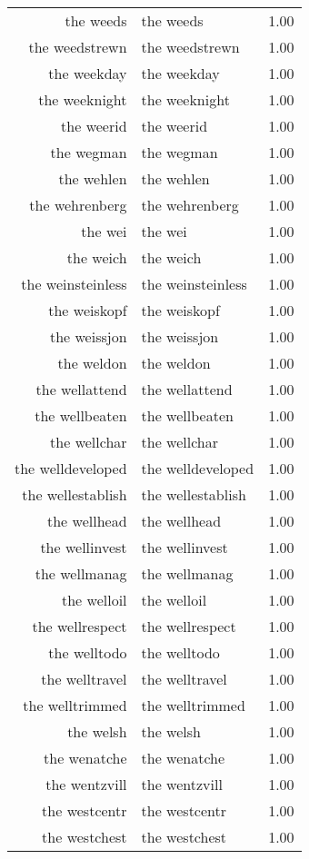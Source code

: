 \begin{table}[ht]
\begin{tabular}{rlr}
  the weeds & the weeds & 1.00 \\ 
  the weedstrewn & the weedstrewn & 1.00 \\ 
  the weekday & the weekday & 1.00 \\ 
  the weeknight & the weeknight & 1.00 \\ 
  the weerid & the weerid & 1.00 \\ 
  the wegman & the wegman & 1.00 \\ 
  the wehlen & the wehlen & 1.00 \\ 
  the wehrenberg & the wehrenberg & 1.00 \\ 
  the wei & the wei & 1.00 \\ 
  the weich & the weich & 1.00 \\ 
  the weinsteinless & the weinsteinless & 1.00 \\ 
  the weiskopf & the weiskopf & 1.00 \\ 
  the weissjon & the weissjon & 1.00 \\ 
  the weldon & the weldon & 1.00 \\ 
  the wellattend & the wellattend & 1.00 \\ 
  the wellbeaten & the wellbeaten & 1.00 \\ 
  the wellchar & the wellchar & 1.00 \\ 
  the welldeveloped & the welldeveloped & 1.00 \\ 
  the wellestablish & the wellestablish & 1.00 \\ 
  the wellhead & the wellhead & 1.00 \\ 
  the wellinvest & the wellinvest & 1.00 \\ 
  the wellmanag & the wellmanag & 1.00 \\ 
  the welloil & the welloil & 1.00 \\ 
  the wellrespect & the wellrespect & 1.00 \\ 
  the welltodo & the welltodo & 1.00 \\ 
  the welltravel & the welltravel & 1.00 \\ 
  the welltrimmed & the welltrimmed & 1.00 \\ 
  the welsh & the welsh & 1.00 \\ 
  the wenatche & the wenatche & 1.00 \\ 
  the wentzvill & the wentzvill & 1.00 \\ 
  the westcentr & the westcentr & 1.00 \\ 
  the westchest & the westchest & 1.00 \\ 

\end{tabular}
\end{table}
